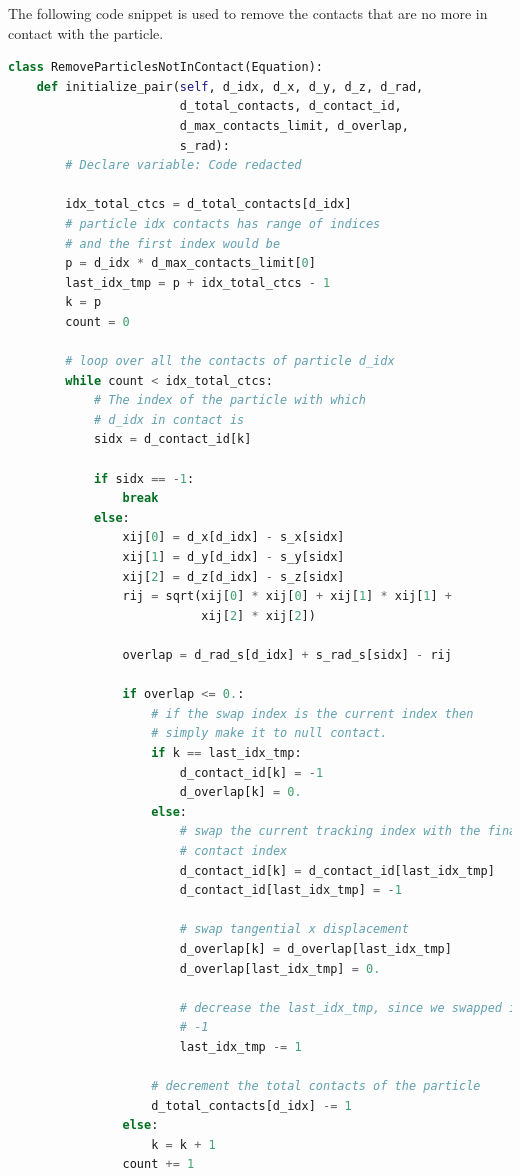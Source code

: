 The following code snippet is used to remove the contacts that are no more in
contact with the particle.
 \lstset{basicstyle=\footnotesize\ttfamily}
\begin{lstlisting}[label={contact:equations},frame=lines,language=Python,upquote=True]
class RemoveParticlesNotInContact(Equation):
    def initialize_pair(self, d_idx, d_x, d_y, d_z, d_rad,
                        d_total_contacts, d_contact_id,
                        d_max_contacts_limit, d_overlap,
                        s_rad):
        # Declare variable: Code redacted

        idx_total_ctcs = d_total_contacts[d_idx]
        # particle idx contacts has range of indices
        # and the first index would be
        p = d_idx * d_max_contacts_limit[0]
        last_idx_tmp = p + idx_total_ctcs - 1
        k = p
        count = 0

        # loop over all the contacts of particle d_idx
        while count < idx_total_ctcs:
            # The index of the particle with which
            # d_idx in contact is
            sidx = d_contact_id[k]

            if sidx == -1:
                break
            else:
                xij[0] = d_x[d_idx] - s_x[sidx]
                xij[1] = d_y[d_idx] - s_y[sidx]
                xij[2] = d_z[d_idx] - s_z[sidx]
                rij = sqrt(xij[0] * xij[0] + xij[1] * xij[1] +
                           xij[2] * xij[2])

                overlap = d_rad_s[d_idx] + s_rad_s[sidx] - rij

                if overlap <= 0.:
                    # if the swap index is the current index then
                    # simply make it to null contact.
                    if k == last_idx_tmp:
                        d_contact_id[k] = -1
                        d_overlap[k] = 0.
                    else:
                        # swap the current tracking index with the final
                        # contact index
                        d_contact_id[k] = d_contact_id[last_idx_tmp]
                        d_contact_id[last_idx_tmp] = -1

                        # swap tangential x displacement
                        d_overlap[k] = d_overlap[last_idx_tmp]
                        d_overlap[last_idx_tmp] = 0.

                        # decrease the last_idx_tmp, since we swapped it to
                        # -1
                        last_idx_tmp -= 1

                    # decrement the total contacts of the particle
                    d_total_contacts[d_idx] -= 1
                else:
                    k = k + 1
                count += 1
\end{lstlisting}
